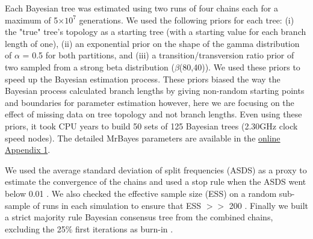 \documentclass[12pt,letterpaper]{article}
\begin{document}
Each Bayesian tree was estimated using two runs of four chains each for a maximum of 5$\times$$10^7$ generations. We used the following priors for each tree: (i) the "true" tree’s topology as a starting tree (with a starting value for each branch length of one), (ii) an exponential prior on the shape of the gamma distribution of $\alpha$ = 0.5 for both partitions, and (iii) a transition/transversion ratio prior of two sampled from a strong beta distribution ($\beta$(80,40)). We used these priors to speed up the Bayesian estimation process. These priors biased the way the Bayesian process calculated branch lengths by giving non-random starting points and boundaries for parameter estimation however, here we are focusing on the effect of missing data on tree topology and not branch lengths. Even using these priors, it took  CPU years to build 50 sets of 125 Bayesian trees (2.30GHz clock speed nodes). The detailed MrBayes parameters are available in the \hyperref[SupplementaryMaterial]{online Appendix 1}.

We used the average standard deviation of split frequencies (ASDS) as a proxy to estimate the convergence of the chains and used a stop rule when the ASDS went below 0.01 \citep{Ronquist2012mrbayes}. We also checked the effective sample size (ESS) on a random sub-sample of runs in each simulation to ensure that ESS $>>$ 200 \citep{drummond2006ess}. Finally we built a strict majority rule Bayesian consensus tree from the combined chains, excluding the 25\% first iterations as burn-in \citep{Ronquist2012mrbayes}.
\end{document}
